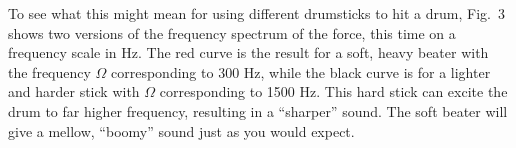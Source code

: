 
  To see what this might mean for using different drumsticks to hit a drum, 
  Fig.\ 3 shows two versions of the frequency spectrum of the force, this time 
  on a frequency scale in Hz. The red curve is the result for a soft, heavy 
  beater with the frequency $\Omega$ corresponding to 300 Hz, while the black 
  curve is for a lighter and harder stick with $\Omega$ corresponding to 1500 
  Hz. This hard stick can excite the drum to far higher frequency, resulting in 
  a ``sharper'' sound. The soft beater will give a mellow, ``boomy'' sound just 
  as you would expect. 

